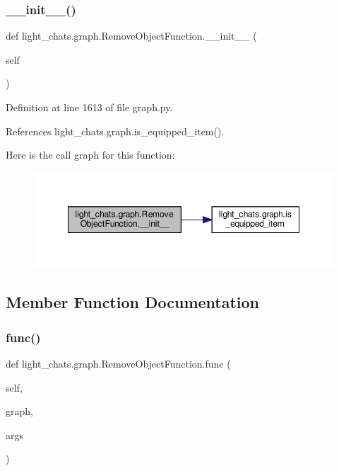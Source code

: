 \subsubsection{\texorpdfstring{\+\_\+\+\_\+init\+\_\+\+\_\+()}{\_\_init\_\_()}}
{\footnotesize\ttfamily def light\+\_\+chats.\+graph.\+Remove\+Object\+Function.\+\_\+\+\_\+init\+\_\+\+\_\+ (\begin{DoxyParamCaption}\item[{}]{self }\end{DoxyParamCaption})}



Definition at line 1613 of file graph.\+py.



References light\+\_\+chats.\+graph.\+is\+\_\+equipped\+\_\+item().

Here is the call graph for this function\+:
\nopagebreak
\begin{figure}[H]
\begin{center}
\leavevmode
\includegraphics[width=348pt]{classlight__chats_1_1graph_1_1RemoveObjectFunction_a1ec221c7902c9aebb94137d84c1ee929_cgraph}
\end{center}
\end{figure}


\subsection{Member Function Documentation}
\mbox{\label{classlight__chats_1_1graph_1_1RemoveObjectFunction_ae7b012e25908e96e2aaffcd567c0e133}} 
\subsubsection{\texorpdfstring{func()}{func()}}
{\footnotesize\ttfamily def light\+\_\+chats.\+graph.\+Remove\+Object\+Function.\+func (\begin{DoxyParamCaption}\item[{}]{self,  }\item[{}]{graph,  }\item[{}]{args }\end{DoxyParamCaption})}

